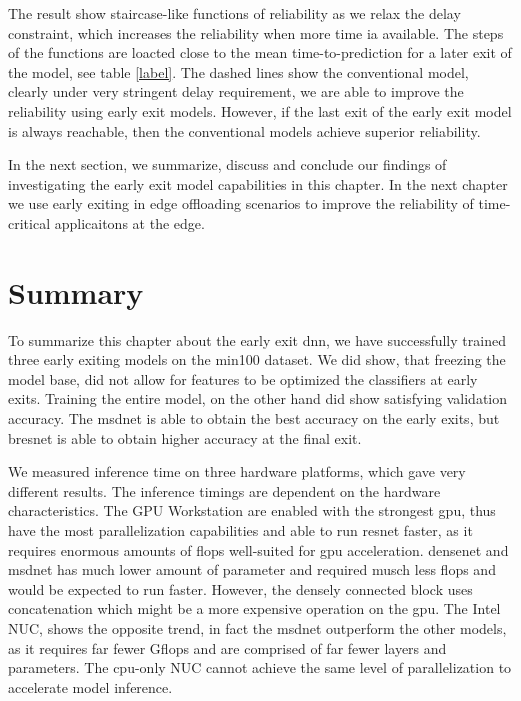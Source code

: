 The result show staircase-like functions of reliability as we relax the delay constraint, which increases the reliability when more time ia available. The steps of the functions are loacted close to the mean time-to-prediction for a later exit of the model, see table \ref{label}. The dashed lines show the conventional model, clearly under very stringent delay requirement, we are able to improve the reliability using early exit models. However, if the last exit of the early exit model is always reachable, then the conventional models achieve superior reliability. 

In the next section, we summarize, discuss and conclude our findings of investigating the early exit model capabilities in this chapter. In the next chapter we use early exiting in edge offloading scenarios to improve the reliability of time-critical applicaitons at the edge.

\section{Summary} \label{sec:ee-summary}

To summarize this chapter about the early exit \gls{dnn}, we have successfully trained three early exiting models on the \gls{min100} dataset. We did show, that freezing the model base, did not allow for features to be optimized the classifiers at early exits. Training the entire model, on the other hand did show satisfying validation accuracy. The \gls{msdnet} is able to obtain the best accuracy on the early exits, but \gls{bresnet} is able to obtain higher accuracy at the final exit. 

We measured inference time on three hardware platforms, which gave very different results. The inference timings are dependent on the hardware characteristics. The GPU Workstation are enabled with the strongest \gls{gpu}, thus have the most parallelization capabilities and able to run \gls{resnet} faster, as it requires enormous amounts of \gls{flop}s well-suited for \gls{gpu} acceleration. \gls{densenet} and \gls{msdnet} has much lower amount of parameter and required musch less \gls{flop}s and would be expected to run faster. However, the densely connected block uses concatenation which might be a more expensive operation on the \gls{gpu}. The Intel NUC, shows the opposite trend, in fact the \gls{msdnet} outperform the other models, as it requires far fewer G\gls{flop}s and are comprised of far fewer layers and parameters. The \gls{cpu}-only NUC cannot achieve the same level of parallelization to accelerate model inference.

